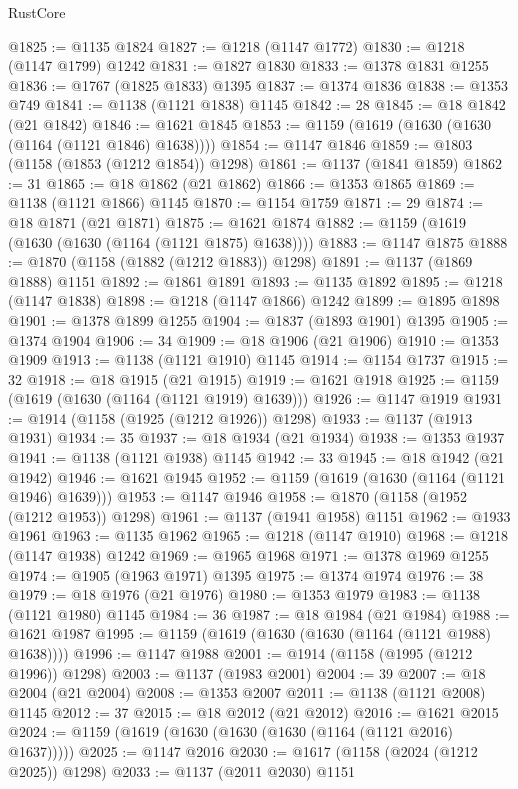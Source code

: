 \begin{lexlean}{RustCore}
\begin{coremodule}
@1825 := @1135 @1824
@1827 := @1218 (@1147 @1772)
@1830 := @1218 (@1147 @1799) @1242
@1831 := @1827 @1830
@1833 := @1378 @1831 @1255
@1836 := @1767 (@1825 @1833) @1395
@1837 := @1374 @1836
@1838 := @1353 @749
@1841 := @1138 (@1121 @1838) @1145
@1842 := 28
@1845 := @18 @1842 (@21 @1842)
@1846 := @1621 @1845
@1853 := @1159 (@1619 (@1630 (@1630 (@1164 (@1121 @1846) @1638))))
@1854 := @1147 @1846
@1859 := @1803 (@1158 (@1853 (@1212 @1854)) @1298)
@1861 := @1137 (@1841 @1859)
@1862 := 31
@1865 := @18 @1862 (@21 @1862)
@1866 := @1353 @1865
@1869 := @1138 (@1121 @1866) @1145
@1870 := @1154 @1759
@1871 := 29
@1874 := @18 @1871 (@21 @1871)
@1875 := @1621 @1874
@1882 := @1159 (@1619 (@1630 (@1630 (@1164 (@1121 @1875) @1638))))
@1883 := @1147 @1875
@1888 := @1870 (@1158 (@1882 (@1212 @1883)) @1298)
@1891 := @1137 (@1869 @1888) @1151
@1892 := @1861 @1891
@1893 := @1135 @1892
@1895 := @1218 (@1147 @1838)
@1898 := @1218 (@1147 @1866) @1242
@1899 := @1895 @1898
@1901 := @1378 @1899 @1255
@1904 := @1837 (@1893 @1901) @1395
@1905 := @1374 @1904
@1906 := 34
@1909 := @18 @1906 (@21 @1906)
@1910 := @1353 @1909
@1913 := @1138 (@1121 @1910) @1145
@1914 := @1154 @1737
@1915 := 32
@1918 := @18 @1915 (@21 @1915)
@1919 := @1621 @1918
@1925 := @1159 (@1619 (@1630 (@1164 (@1121 @1919) @1639)))
@1926 := @1147 @1919
@1931 := @1914 (@1158 (@1925 (@1212 @1926)) @1298)
@1933 := @1137 (@1913 @1931)
@1934 := 35
@1937 := @18 @1934 (@21 @1934)
@1938 := @1353 @1937
@1941 := @1138 (@1121 @1938) @1145
@1942 := 33
@1945 := @18 @1942 (@21 @1942)
@1946 := @1621 @1945
@1952 := @1159 (@1619 (@1630 (@1164 (@1121 @1946) @1639)))
@1953 := @1147 @1946
@1958 := @1870 (@1158 (@1952 (@1212 @1953)) @1298)
@1961 := @1137 (@1941 @1958) @1151
@1962 := @1933 @1961
@1963 := @1135 @1962
@1965 := @1218 (@1147 @1910)
@1968 := @1218 (@1147 @1938) @1242
@1969 := @1965 @1968
@1971 := @1378 @1969 @1255
@1974 := @1905 (@1963 @1971) @1395
@1975 := @1374 @1974
@1976 := 38
@1979 := @18 @1976 (@21 @1976)
@1980 := @1353 @1979
@1983 := @1138 (@1121 @1980) @1145
@1984 := 36
@1987 := @18 @1984 (@21 @1984)
@1988 := @1621 @1987
@1995 := @1159 (@1619 (@1630 (@1630 (@1164 (@1121 @1988) @1638))))
@1996 := @1147 @1988
@2001 := @1914 (@1158 (@1995 (@1212 @1996)) @1298)
@2003 := @1137 (@1983 @2001)
@2004 := 39
@2007 := @18 @2004 (@21 @2004)
@2008 := @1353 @2007
@2011 := @1138 (@1121 @2008) @1145
@2012 := 37
@2015 := @18 @2012 (@21 @2012)
@2016 := @1621 @2015
@2024 := @1159 (@1619 (@1630 (@1630 (@1630 (@1164 (@1121 @2016) @1637)))))
@2025 := @1147 @2016
@2030 := @1617 (@1158 (@2024 (@1212 @2025)) @1298)
@2033 := @1137 (@2011 @2030) @1151

\end{coremodule}
\end{lexlean}

